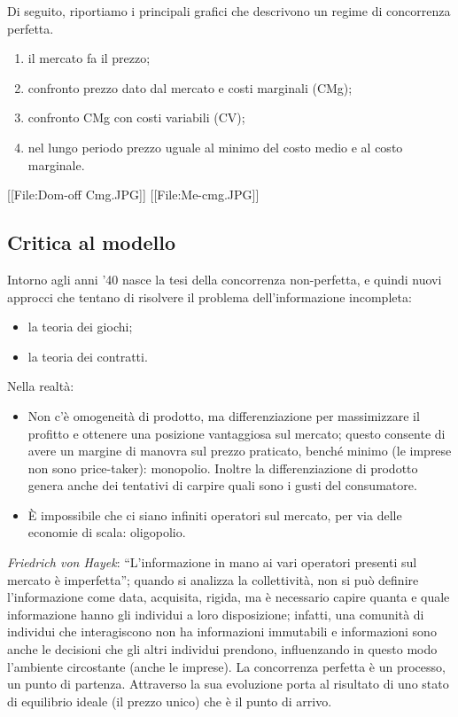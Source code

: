 Di seguito, riportiamo i principali grafici che descrivono un regime di 
concorrenza perfetta.

\begin{enumerate} [noitemsep]
\item il mercato fa il prezzo;
\item confronto prezzo dato dal mercato e costi marginali (CMg);
\item confronto CMg con costi variabili (CV);
\item nel lungo periodo prezzo uguale al minimo del costo medio e al costo 
marginale.
\end{enumerate}

[[File:Dom-off Cmg.JPG]]
[[File:Me-cmg.JPG]]

\subsection{Critica al modello}

Intorno agli anni '40 nasce la tesi della concorrenza non-perfetta, e quindi 
nuovi approcci che tentano di risolvere il problema dell'informazione 
incompleta:
\begin{itemize} [noitemsep]
 \item la teoria dei giochi;
 \item la teoria dei contratti.
\end{itemize}

Nella realtà:
\begin{itemize} [noitemsep]
 \item Non c'è omogeneità di prodotto, ma differenziazione per massimizzare il 
profitto e ottenere una posizione vantaggiosa sul mercato; questo consente di 
avere un margine di manovra sul prezzo praticato, benché minimo (le imprese non 
sono price-taker): monopolio. Inoltre la differenziazione di prodotto genera 
anche dei tentativi di carpire quali sono i gusti del consumatore.
 \item È impossibile che ci siano infiniti operatori sul mercato, per via delle 
economie di scala: oligopolio.
\end{itemize}


\emph{Friedrich von Hayek}: “L'informazione in mano ai vari operatori 
presenti sul mercato è imperfetta”; quando si analizza la collettività, non si 
può definire l'informazione come data, acquisita, rigida, ma è necessario 
capire quanta e quale informazione hanno gli individui a loro disposizione; 
infatti, una comunità di individui che interagiscono non ha informazioni 
immutabili e informazioni sono anche le decisioni che gli altri individui 
prendono, influenzando in questo modo l'ambiente circostante (anche le imprese).
La concorrenza perfetta è un processo, un punto di partenza. Attraverso la sua 
evoluzione porta al risultato di uno stato di equilibrio ideale (il prezzo 
unico) che è il punto di arrivo.

